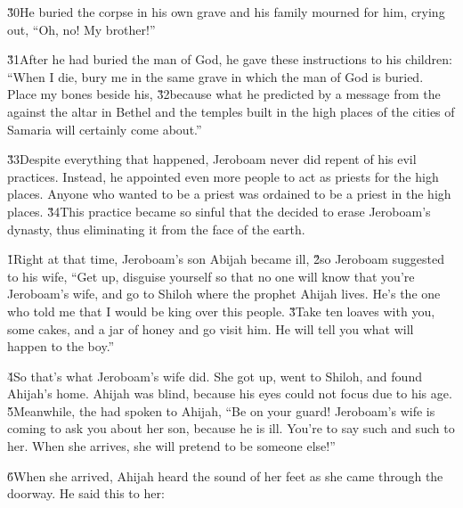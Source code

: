 \v{30}He buried the corpse in his own grave and his family mourned for him, crying out, ``Oh, no! My brother!''

\v{31}After he had buried the man of God, he gave these instructions to his children: ``When I die, bury me in the same grave in which the man of God is buried. Place my bones beside his, \v{32}because what he predicted by a message from the  against the altar in Bethel and the temples built in the high places of the cities of Samaria will certainly come about.''

\v{33}Despite everything that happened, Jeroboam never did repent of his evil practices. Instead, he appointed even more people to act as priests for the high places. Anyone who wanted to be a priest was ordained to be a priest in the high places. \v{34}This practice became so sinful that the  decided to erase Jeroboam's dynasty, thus eliminating it from the face of the earth.

\v{1}Right at that time, Jeroboam's son Abijah became ill, \v{2}so Jeroboam suggested to his wife, ``Get up, disguise yourself so that no one will know that you're Jeroboam's wife, and go to Shiloh where the prophet Ahijah lives. He's the one who told me that I would be king over this people. \v{3}Take ten loaves with you, some cakes, and a jar of honey and go visit him. He will tell you what will happen to the boy.''

\v{4}So that's what Jeroboam's wife did. She got up, went to Shiloh, and found Ahijah's home. Ahijah was blind, because his eyes could not focus due to his age. \v{5}Meanwhile, the  had spoken to Ahijah, ``Be on your guard! Jeroboam's wife is coming to ask you about her son, because he is ill. You're to say such and such to her. When she arrives, she will pretend to be someone else!''

\v{6}When she arrived, Ahijah heard the sound of her feet as she came through the doorway. He said this to her:

